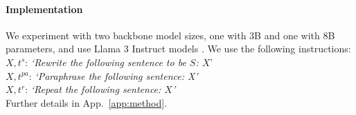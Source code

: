 \paragraph{Implementation}
We experiment with two backbone model sizes, one with 3B and one with 8B parameters, and use Llama 3 Instruct models \cite{dubey2024llama}. We use the following instructions:
\\
\noindent $X,t^{s}$: \textit{`Rewrite the following sentence to be $S$: $X$}'\\
\noindent $X,t^{pa}$: \textit{`Paraphrase the following sentence: X'}\\
\noindent $X,t^{r}$: \textit{`Repeat the following sentence: $X$'}\\
Further details in App.~\ref{app:method}.
    